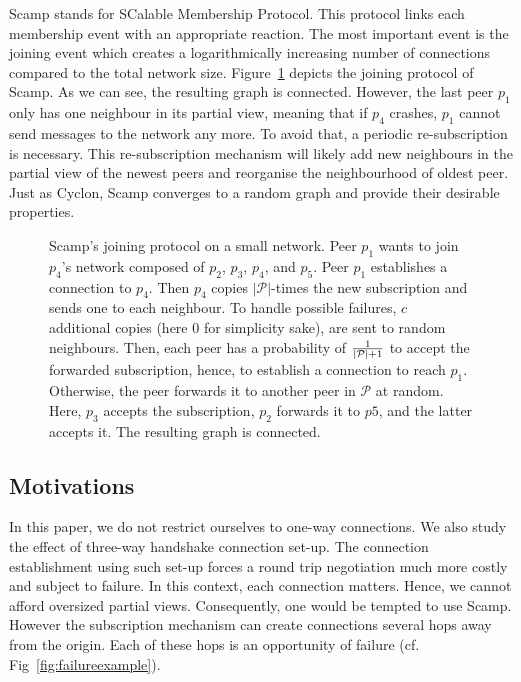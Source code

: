 \begin{asparadesc}
\item [Scamp]\cite{ganesh2001scamp,ganesh2003peer} stands for SCalable
  Membership Protocol. This protocol links each membership event with an
  appropriate reaction.  The most important event is the joining event which
  creates a logarithmically increasing number of connections compared to the
  total network size.  Figure~\ref{fig:scampexample} depicts the joining
  protocol of Scamp. As we can see, the resulting graph is connected. However,
  the last peer $p_1$ only has one neighbour in its partial view, meaning that
  if $p_4$ crashes, $p_1$ cannot send messages to the network any more. To
  avoid that, a periodic re-subscription is necessary. This re-subscription
  mechanism will likely add new neighbours in the partial view of the newest
  peers and reorganise the neighbourhood of oldest peer. Just as Cyclon, Scamp
  converges to a random graph and provide their desirable properties.
\end{asparadesc}

\begin{figure}
  \centering
  
  \caption{\label{fig:scampexample} Scamp's joining protocol on a small
    network. Peer $p_1$ wants to join $p_4$'s network composed of $p_2$,
    $p_3$, $p_4$, and $p_5$. Peer $p_1$ establishes a connection to $p_4$. Then
    $p_4$ copies $|\mathcal{P}|$-times the new subscription and sends one to
    each neighbour. To handle possible failures, $c$ additional copies (here
    $0$ for simplicity sake), are sent to random neighbours. Then, each peer
    has a probability of $1\over{|\mathcal{P}|+1}$ to accept the forwarded
    subscription, hence, to establish a connection to reach $p_1$. Otherwise,
    the peer forwards it to another peer in $\mathcal{P}$ at random. Here,
    $p_3$ accepts the subscription, $p_2$ forwards it to $p5$, and the latter
    accepts it. The resulting graph is connected.}
\end{figure}

\subsection{Motivations}
In this paper, we do not restrict ourselves to one-way connections. We also
study the effect of three-way handshake connection set-up. The connection
establishment using such set-up forces a round trip negotiation much more
costly and subject to failure. In this context, each connection matters. Hence,
we cannot afford oversized partial views. Consequently, one would be tempted to
use Scamp. However the subscription mechanism can create connections several
hops away from the origin. Each of these hops is an opportunity of failure
(cf. Fig~\ref{fig:failureexample}).

